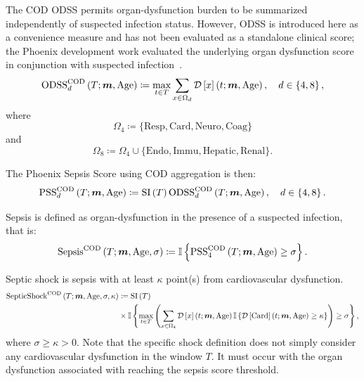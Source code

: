 \documentclass[letterpaper,10pt]{article}
\begin{document}
The COD ODSS permits organ-dysfunction burden to be summarized independently
of suspected infection status. However, ODSS is introduced here as a convenience
measure and has not been evaluated as a standalone clinical score; the Phoenix
development work evaluated the underlying organ dysfunction score in conjunction
with suspected infection~\citep{Sanchez-Pinto2024,Schlapbach2024}.
\begin{equation}
  \label{eq:odss}
  \ODSS{d}[COD] \coloneqq
  \maxtinT \sum_{x \in \Omega_{d}} \DS*{x}, \quad d \in \left\{4, 8\right\},
\end{equation}
where
\begin{equation}
  \label{eq:omega4}
  \Omega_{4} \coloneqq \{\mathrm{Resp}, \mathrm{Card}, \mathrm{Neuro}, \mathrm{Coag}\}
\end{equation}
and
\begin{equation}
  \label{eq:omega8}
  \Omega_{8} \coloneqq \Omega_{4} \cup \{\mathrm{Endo}, \mathrm{Immu}, \mathrm{Hepatic}, \mathrm{Renal}\}.
\end{equation}

The Phoenix Sepsis Score using COD aggregation is then:
\begin{equation}
  \label{eq:pss}
  \PSS{d}[COD] \coloneqq \SI \ODSS{d}[COD],
  \quad d \in \left\{4, 8\right\}.
\end{equation}

Sepsis is defined as organ-dysfunction in the presence of a suspected
infection, that is:
\begin{equation}
  \label{eq:sepsis}
  \Sepsis[COD] \coloneqq
  \mathbb{I} \left\{\PSS{4}[COD] \geq \sigma \right\}.
\end{equation}

Septic shock is sepsis with at least $\kappa$ point(s) from cardiovascular dysfunction.
\begin{equation}
  \label{eq:septicshock}
  \begin{split}
    \SepticShock[COD] & \coloneqq \SI \\ & \times
    \mathbb{I} \left\{
      \maxtinT \left( \sum_{x \in \Omega_{4}} \DS*{x} \mathbb{I}\left\{\DS{Card} \geq \kappa \right\} \right)
    \geq \sigma \right\},
  \end{split}
\end{equation}
where $\sigma \geq \kappa > 0.$
Note that the specific shock definition does not simply consider any
cardiovascular dysfunction in the window $T.$  It must occur with the organ
dysfunction associated with reaching the sepsis score threshold.
\end{document}
